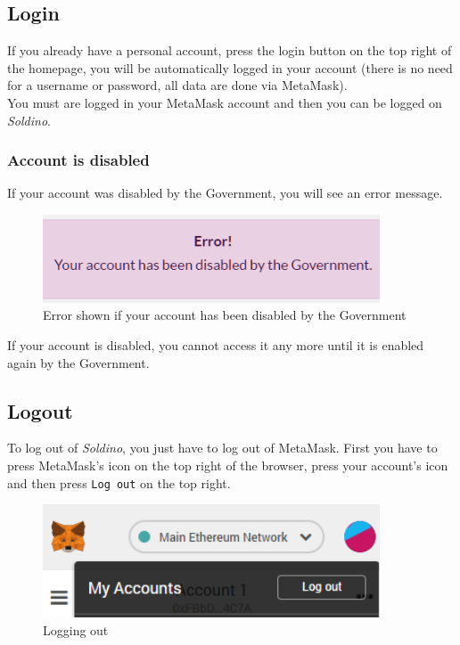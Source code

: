 	\subsection{Login}
	If you already have a personal account, press the login button on the 
	top right of the homepage, you will be automatically logged in your account 
	(there is no need for a username or password, all data are done via MetaMask). 
	\\You must are logged in your MetaMask\glo{} account and then you can be logged on \textit{Soldino}.
		\subsubsection{Account is disabled}
		If your account was disabled by the Government, you will see an error 
		message.
		\begin{figure}[H]
			\includegraphics[width=10cm]{res/images/user_disabled.png}
			\centering
			\caption{Error shown if your account has been disabled by the Government}
		\end{figure}
	\noindent If your account is disabled, you cannot access it any more until it 
	is enabled again by the Government.
	\subsection{Logout}
	To log out of \textit{Soldino}, you just have to log out of 
	MetaMask\glo{}. First you have to press MetaMask's icon on the top 
	right of the browser, press your account's icon and then press \texttt{Log out}
	on the top right.
	\begin{figure}[H]
		\includegraphics[width=10cm]{res/images/logout_metamask.png}
		\centering
		\caption{Logging out}
	\end{figure}
